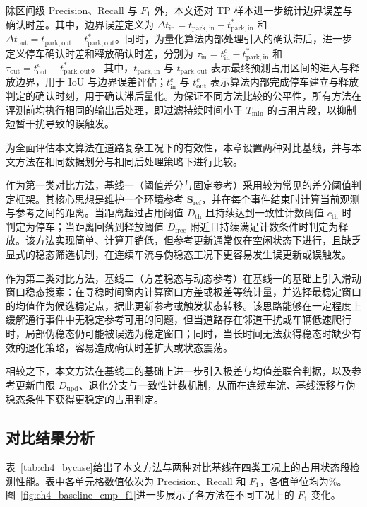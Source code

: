 \documentclass{xdupgthesis}
\begin{document}
除区间级 Precision、Recall 与 $F_1$ 外，本文还对 TP 样本进一步统计边界误差与确认时差。其中，边界误差定义为 $\Delta t_{\mathrm{in}}=t_{\mathrm{park,in}}-t^{*}_{\mathrm{park,in}}$ 和 $\Delta t_{\mathrm{out}}=t_{\mathrm{park,out}}-t^{*}_{\mathrm{park,out}}$。同时，为量化算法内部处理引入的确认滞后，进一步定义停车确认时差和释放确认时差，分别为 $\tau_{\mathrm{in}}=t^{c}_{\mathrm{in}}-t^{*}_{\mathrm{park,in}}$ 和 $\tau_{\mathrm{out}}=t^{c}_{\mathrm{out}}-t^{*}_{\mathrm{park,out}}$。
其中，$t_{\mathrm{park,in}}$ 与 $t_{\mathrm{park,out}}$ 表示最终预测占用区间的进入与释放边界，用于 IoU 与边界误差评估；$t^{c}_{\mathrm{in}}$ 与 $t^{c}_{\mathrm{out}}$ 表示算法内部完成停车建立与释放判定的确认时刻，用于确认滞后量化。为保证不同方法比较的公平性，所有方法在评测前均执行相同的输出后处理，即过滤持续时间小于 $T_{\min}$ 的占用片段，以抑制短暂干扰导致的误触发。

为全面评估本文算法在道路复杂工况下的有效性，本章设置两种对比基线，并与本文方法在相同数据划分与相同后处理策略下进行比较。

作为第一类对比方法，基线一（阈值差分与固定参考）采用较为常见的差分阈值判定框架。其核心思想是维护一个环境参考 $\mathbf{S}_{\mathrm{ref}}$，并在每个事件结束时计算当前观测与参考之间的距离。当距离超过占用阈值 $D_{\mathrm{th}}$ 且持续达到一致性计数阈值 $c_{\mathrm{th}}$ 时判定为停车；当距离回落到释放阈值 $D_{\mathrm{free}}$ 附近且持续满足计数条件时判定为释放。该方法实现简单、计算开销低，但参考更新通常仅在空闲状态下进行，且缺乏显式的稳态筛选机制，在连续车流与伪稳态工况下更容易发生误更新或误触发。

作为第二类对比方法，基线二（方差稳态与动态参考）在基线一的基础上引入滑动窗口稳态搜索：在寻稳时间窗内计算窗口方差或极差等统计量，并选择最稳定窗口的均值作为候选稳定点，据此更新参考或触发状态转移。该思路能够在一定程度上缓解通行事件中无稳定参考可用的问题，但当道路存在邻道干扰或车辆低速爬行时，局部伪稳态仍可能被误选为稳定窗口；同时，当长时间无法获得稳态时缺少有效的退化策略，容易造成确认时差扩大或状态震荡。

相较之下，本文方法在基线二的基础上进一步引入极差与均值差联合判据，以及参考更新门限 $D_{\mathrm{upd}}$、退化分支与一致性计数机制，从而在连续车流、基线漂移与伪稳态条件下获得更稳定的占用判定。

\subsection{对比结果分析}
\label{subsec:ch4_results}

表~\ref{tab:ch4_bycase}给出了本文方法与两种对比基线在四类工况上的占用状态段检测性能。表中各单元格数值依次为 Precision、Recall 和 $F_1$，各值单位均为\%。图~\ref{fig:ch4_baseline_cmp_f1}进一步展示了各方法在不同工况上的 $F_1$ 变化。
\end{document}
